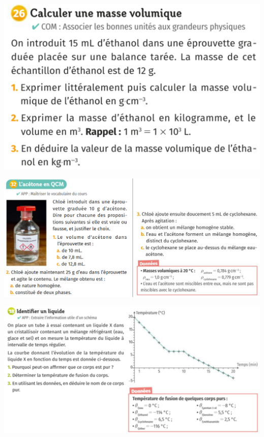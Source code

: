 \includegraphics[scale=0.8]{Images/Chapitre_1/Exo_3_Chap1.png}
\vspace{1cm}

\includegraphics[scale=0.6]{Images/Chapitre_1/Exo_6_Chap1.png}
\vspace{1cm}

\includegraphics[scale=1]{Images/Chapitre_1/Exo_7_Chap1.png}

